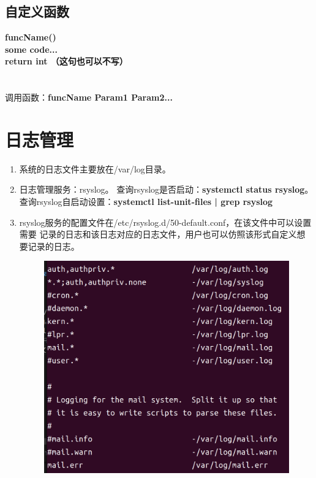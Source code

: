 \documentclass[11pt]{article}
\begin{document}
\subsection{自定义函数}
\textbf{
    funcName()\textbraceleft \\
        some code... \\
        return int \quad （这句也可以不写）\\
    \textbraceright  \\
} \\
调用函数：\textbf{funcName Param1 Param2...}

\section{日志管理}
\begin{enumerate}
    \item 系统的日志文件主要放在/var/log目录。
    \item 日志管理服务：rsyslog。 \quad 查询rsyslog是否启动：\textbf{systemctl status 
    rsyslog}。 \quad 查询rsyslog自启动设置：\textbf{systemctl list-unit-files | grep rsyslog}
    \item rsyslog服务的配置文件在/etc/rsyslog.d/50-default.conf，在该文件中可以设置需要
    记录的日志和该日志对应的日志文件，用户也可以仿照该形式自定义想要记录的日志。 \\
    \begin{figure}[htb]
        \centering
        \includegraphics[scale=0.13]{imgs/log_conf.png}

\end{figure}
\end{enumerate}
\end{document}

